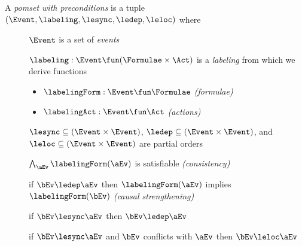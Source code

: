 \begin{definition}
  A \emph{pomset with preconditions} is a tuple
  $(\Event, \labeling, {\lesync}, {\ledep}, {\leloc})$ where
  \begin{description}
  \item[{}] $\Event$ is a set of \emph{events}
  \item[{}]
    $\labeling: \Event \fun (\Formulae\times\Act)$ is a \emph{labeling} from
    which we derive functions
    \begin{itemize}
    \item $\labelingForm:\Event\fun\Formulae$
      \emph{(formulae)} %
    \item $\labelingAct:\Event\fun\Act$
      \emph{(actions)} %
    \end{itemize}
  \item[{}]
    ${\lesync} \subseteq (\Event\times\Event)$,
    ${\ledep} \subseteq (\Event\times\Event)$, and
    ${\leloc} \subseteq (\Event\times\Event)$ are partial orders
  \item[{}] $\bigwedge_{\aEv}\labelingForm(\aEv)$ is satisfiable \emph{(consistency)}
  \item[{}] if $\bEv\ledep\aEv$ then $\labelingForm(\aEv)$ implies $\labelingForm(\bEv)$ \emph{(causal strengthening)} 
  \item[{}] if $\bEv\lesync\aEv$ then $\bEv\ledep\aEv$
  \item[{}] if $\bEv\lesync\aEv$ and $\bEv$ conflicts with $\aEv$ then $\bEv\leloc\aEv$
  \end{description}
\end{definition}





